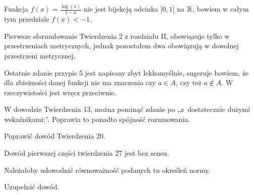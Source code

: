 \documentclass[a4paper,11pt]{article}
\begin{document}
\vspace{\spaceFour}


\start {} Funkcja $f( x ) = \frac{ \log( x ) }{ 1 - x }$ nie
jest bijekcją odcinka $] 0, 1 [$ na $\mathbb{R}$, bowiem w całym tym
przedziale $f( x ) < -1$.

\vspace{\spaceFour}


\start {} Pierwsze sformułowanie Twierdzenia 2 z rozdziału II,
obowiązuje tylko w przestrzeniach metrycznych, jednak pozostałem dwa
obowiązują w dowolnej przestrzeni metrycznej.

\vspace{\spaceFour}


\start {} Ostatnie zdanie przypis 5 jest napisany zbyt
lekkomyślnie, sugeruje bowiem, że dla zbieżności danej funkcji nie ma
znaczenia czy $a \in A$, czy też $a \notin A$. W rzeczywistości jest
wręcz przeciwnie.

\vspace{\spaceFour}


\start {} W dowodzie Twierdzenia 13, można pominąć zdanie po
„z~dostatecznie dużymi wskaźnikami;”. Poprawia to ponadto spójność
rozumowania.

\vspace{\spaceFour}


\start {} Poprawić dowód Twierdzenia 20. 

\vspace{\spaceFour}


\start {} Dowód pierwszej części twierdzenia 27 jest bez sensu.

\vspace{\spaceFour}


\start {} Należałoby udowodnić równoważność podanych tu określeń
normy.

\vspace{\spaceFour}


\start {} Uzupełnić dowód.

\vspace{\spaceFour}
\end{document}
